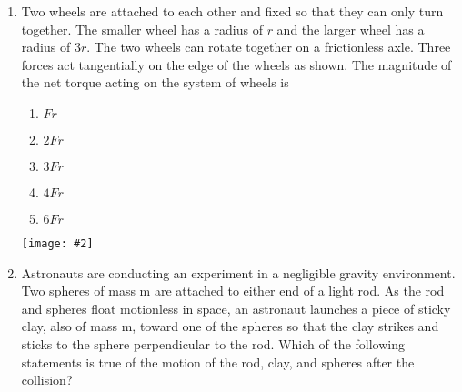 \documentclass[12pt]{article}
\newcommand{\pic}[2]{\texttt{[image: \#2]}}
\begin{document}
\begin{enumerate}[leftmargin=50pt,label=\underline{\hspace{0.4in}} \arabic*]
  \begin{minipage}{0.3\textwidth}
    \begin{enumerate}[noitemsep,topsep=0pt]
    \item A
    \item B
    \item C
    \item D
    \item E
    \end{enumerate}
  \end{minipage}
  \begin{minipage}{0.6\textwidth}
    \pic{.8}{light-rod.png}
  \end{minipage}

\item Two wheels are attached to each other and fixed so that they can only
  turn together. The smaller wheel has a radius of $r$ and the larger wheel
  has a radius of $3r$. The two wheels can rotate together on a frictionless
  axle. Three forces act tangentially on the edge of the wheels as shown.
  The magnitude of the net torque acting on the system of wheels is\\
  \begin{minipage}{0.3\textwidth}
    \begin{enumerate}[noitemsep,topsep=0pt]
    \item$Fr$
    \item$2Fr$
    \item$3Fr$
    \item$4Fr$
    \item$6Fr$
    \end{enumerate}
  \end{minipage}
  \begin{minipage}{0.6\textwidth}
    \pic{.5}{2wheels.png}
  \end{minipage}
  \newpage

\item Astronauts are conducting an experiment in a negligible gravity
  environment. Two spheres of mass m are attached to either end of a
  light rod. As the rod and spheres float motionless in space, an astronaut
  launches a piece of sticky clay, also of mass m, toward one of the
  spheres so that the clay strikes and sticks to the sphere perpendicular to
  the rod. Which of the following statements is true of the motion of the
  rod, clay, and spheres after the collision?
  

\end{enumerate}
\end{document}
